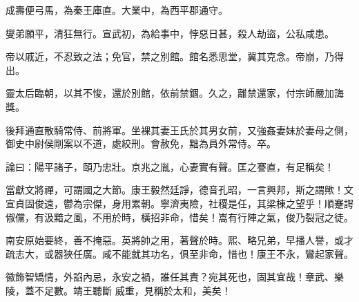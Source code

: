 \begin{pinyinscope}
 成壽便弓馬，為秦王庫直。大業中，為西平郡通守。



 燮弟願平，清狂無行。宣武初，為給事中，悖惡日甚，殺人劫盜，公私咸患。



 帝以戚近，不忍致之法；免官，禁之別館。館名悉思堂，冀其克念。帝崩，乃得出。



 靈太后臨朝，以其不悛，還於別館，依前禁錮。久之，離禁還家，付宗師嚴加誨獎。



 後拜通直散騎常侍、前將軍。坐裸其妻王氏於其男女前，又強姦妻妹於妻母之側，御史中尉侯剛案以不道，處絞刑。會赦免，黜為員外常侍。卒。



 論曰：陽平諸子，頤乃忠壯。京兆之胤，心妻實有聲。匡之謇直，有足稱矣！



 當獻文將禪，可謂國之大節。康王毅然廷諍，德音孔昭，一言興邦，斯之謂歟！文宣貞固俊遠，鬱為宗傑，身用累朝。寧濟夷險，社稷是任，其梁棟之望乎！順蹇諤俶儻，有汲黯之風，不用於時，橫招非命，惜矣！嵩有行陣之氣，俊乃裂冠之徒。



 南安原始要終，善不掩惡。英將帥之用，著聲於時。熙、略兄弟，早播人譽，或才疏志大，或器狹任廣。咸不能就其功名，俱至非命，惜也！康王不永，鸞起家聲。



 徽飾智矯情，外諂內忌，永安之禍，誰任其責？宛其死也，固其宜哉！章武、樂陵，蓋不足數。靖王聽斷
 威重，見稱於太和，美矣！



\end{pinyinscope}